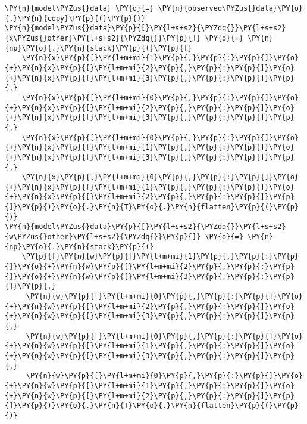     \begin{tcolorbox}[breakable, size=fbox, boxrule=1pt, pad at break*=1mm,colback=cellbackground, colframe=cellborder]
\begin{Verbatim}[commandchars=\\\{\}]
\PY{n}{model\PYZus{}data} \PY{o}{=} \PY{n}{observed\PYZus{}data}\PY{o}{.}\PY{n}{copy}\PY{p}{(}\PY{p}{)}
\PY{n}{model\PYZus{}data}\PY{p}{[}\PY{l+s+s2}{\PYZdq{}}\PY{l+s+s2}{x\PYZus{}other}\PY{l+s+s2}{\PYZdq{}}\PY{p}{]} \PY{o}{=} \PY{n}{np}\PY{o}{.}\PY{n}{stack}\PY{p}{(}\PY{p}{[}
    \PY{n}{x}\PY{p}{[}\PY{l+m+mi}{1}\PY{p}{,}\PY{p}{:}\PY{p}{]}\PY{o}{+}\PY{n}{x}\PY{p}{[}\PY{l+m+mi}{2}\PY{p}{,}\PY{p}{:}\PY{p}{]}\PY{o}{+}\PY{n}{x}\PY{p}{[}\PY{l+m+mi}{3}\PY{p}{,}\PY{p}{:}\PY{p}{]}\PY{p}{,}
    \PY{n}{x}\PY{p}{[}\PY{l+m+mi}{0}\PY{p}{,}\PY{p}{:}\PY{p}{]}\PY{o}{+}\PY{n}{x}\PY{p}{[}\PY{l+m+mi}{2}\PY{p}{,}\PY{p}{:}\PY{p}{]}\PY{o}{+}\PY{n}{x}\PY{p}{[}\PY{l+m+mi}{3}\PY{p}{,}\PY{p}{:}\PY{p}{]}\PY{p}{,}
    \PY{n}{x}\PY{p}{[}\PY{l+m+mi}{0}\PY{p}{,}\PY{p}{:}\PY{p}{]}\PY{o}{+}\PY{n}{x}\PY{p}{[}\PY{l+m+mi}{1}\PY{p}{,}\PY{p}{:}\PY{p}{]}\PY{o}{+}\PY{n}{x}\PY{p}{[}\PY{l+m+mi}{3}\PY{p}{,}\PY{p}{:}\PY{p}{]}\PY{p}{,}
    \PY{n}{x}\PY{p}{[}\PY{l+m+mi}{0}\PY{p}{,}\PY{p}{:}\PY{p}{]}\PY{o}{+}\PY{n}{x}\PY{p}{[}\PY{l+m+mi}{1}\PY{p}{,}\PY{p}{:}\PY{p}{]}\PY{o}{+}\PY{n}{x}\PY{p}{[}\PY{l+m+mi}{2}\PY{p}{,}\PY{p}{:}\PY{p}{]}\PY{p}{]}\PY{p}{)}\PY{o}{.}\PY{n}{T}\PY{o}{.}\PY{n}{flatten}\PY{p}{(}\PY{p}{)}
\PY{n}{model\PYZus{}data}\PY{p}{[}\PY{l+s+s2}{\PYZdq{}}\PY{l+s+s2}{w\PYZus{}other}\PY{l+s+s2}{\PYZdq{}}\PY{p}{]} \PY{o}{=} \PY{n}{np}\PY{o}{.}\PY{n}{stack}\PY{p}{(}
    \PY{p}{[}\PY{n}{w}\PY{p}{[}\PY{l+m+mi}{1}\PY{p}{,}\PY{p}{:}\PY{p}{]}\PY{o}{+}\PY{n}{w}\PY{p}{[}\PY{l+m+mi}{2}\PY{p}{,}\PY{p}{:}\PY{p}{]}\PY{o}{+}\PY{n}{w}\PY{p}{[}\PY{l+m+mi}{3}\PY{p}{,}\PY{p}{:}\PY{p}{]}\PY{p}{,}
     \PY{n}{w}\PY{p}{[}\PY{l+m+mi}{0}\PY{p}{,}\PY{p}{:}\PY{p}{]}\PY{o}{+}\PY{n}{w}\PY{p}{[}\PY{l+m+mi}{2}\PY{p}{,}\PY{p}{:}\PY{p}{]}\PY{o}{+}\PY{n}{w}\PY{p}{[}\PY{l+m+mi}{3}\PY{p}{,}\PY{p}{:}\PY{p}{]}\PY{p}{,}
     \PY{n}{w}\PY{p}{[}\PY{l+m+mi}{0}\PY{p}{,}\PY{p}{:}\PY{p}{]}\PY{o}{+}\PY{n}{w}\PY{p}{[}\PY{l+m+mi}{1}\PY{p}{,}\PY{p}{:}\PY{p}{]}\PY{o}{+}\PY{n}{w}\PY{p}{[}\PY{l+m+mi}{3}\PY{p}{,}\PY{p}{:}\PY{p}{]}\PY{p}{,}
     \PY{n}{w}\PY{p}{[}\PY{l+m+mi}{0}\PY{p}{,}\PY{p}{:}\PY{p}{]}\PY{o}{+}\PY{n}{w}\PY{p}{[}\PY{l+m+mi}{1}\PY{p}{,}\PY{p}{:}\PY{p}{]}\PY{o}{+}\PY{n}{w}\PY{p}{[}\PY{l+m+mi}{2}\PY{p}{,}\PY{p}{:}\PY{p}{]}\PY{p}{]}\PY{p}{)}\PY{o}{.}\PY{n}{T}\PY{o}{.}\PY{n}{flatten}\PY{p}{(}\PY{p}{)}
\end{Verbatim}
\end{tcolorbox}

